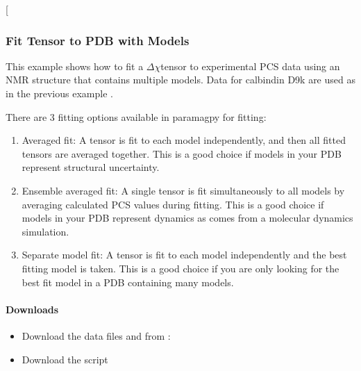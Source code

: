\documentclass[a4paper,10pt,english,openany,oneside]{sphinxmanual}
\begin{document}
\sphinxAtStartPar
{}

\sphinxAtStartPar
{[}\sphinxcode{\sphinxupquote{pcs\_fit\_multiple.png}}{]}

\noindent{}


\subsubsection{Fit Tensor to PDB with Models}
\label{\detokenize{examples/pcs_fit_models:fit-tensor-to-pdb-with-models}}\label{\detokenize{examples/pcs_fit_models:pcs-fit-models}}\label{\detokenize{examples/pcs_fit_models::doc}}
\sphinxAtStartPar
This example shows how to fit a \({\Delta\chi}\)\sphinxhyphen{}tensor to experimental PCS data using an NMR structure that contains multiple models. Data for calbindin D9k are used as in the previous example {\hyperref[\detokenize{examples/pcs_fit:pcs-fit}]{}}.

\sphinxAtStartPar
There are 3 fitting options available in paramagpy for fitting:
\begin{enumerate}
%
\item {} 
\sphinxAtStartPar
Averaged fit: A tensor is fit to each model independently, and then all fitted tensors are averaged together. This is a good choice if models in your PDB represent structural uncertainty.

\item {} 
\sphinxAtStartPar
Ensemble averaged fit: A single tensor is fit simultaneously to all models by averaging calculated PCS values during fitting. This is a good choice if models in your PDB represent dynamics as comes from a molecular dynamics simulation.

\item {} 
\sphinxAtStartPar
Separate model fit: A tensor is fit to each model independently and the best fitting model is taken. This is a good choice if you are only looking for the best fit model in a PDB containing many models.

\end{enumerate}


\paragraph{Downloads}
\label{\detokenize{examples/pcs_fit_models:downloads}}\begin{itemize}
\item {} 
\sphinxAtStartPar
Download the data files  and  from :

\item {} 
\sphinxAtStartPar
Download the script 

\end{itemize}
\end{document}
